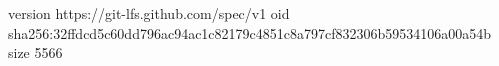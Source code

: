 version https://git-lfs.github.com/spec/v1
oid sha256:32ffdcd5c60dd796ac94ac1c82179c4851c8a797cf832306b59534106a00a54b
size 5566
